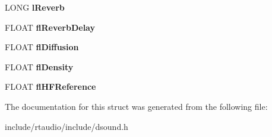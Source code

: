 \begin{DoxyCompactItemize}
\item 
L\+O\+NG {\bfseries l\+Reverb}\hypertarget{struct___d_s_f_x_i3_d_l2_reverb_abd4a04f678bc94a61feb77587de3b6cd}{}\label{struct___d_s_f_x_i3_d_l2_reverb_abd4a04f678bc94a61feb77587de3b6cd}

\item 
F\+L\+O\+AT {\bfseries fl\+Reverb\+Delay}\hypertarget{struct___d_s_f_x_i3_d_l2_reverb_ac42bdcb85a3f4519857687b96a066bd7}{}\label{struct___d_s_f_x_i3_d_l2_reverb_ac42bdcb85a3f4519857687b96a066bd7}

\item 
F\+L\+O\+AT {\bfseries fl\+Diffusion}\hypertarget{struct___d_s_f_x_i3_d_l2_reverb_a947858e3e8e859fa23a9184fc8597e8a}{}\label{struct___d_s_f_x_i3_d_l2_reverb_a947858e3e8e859fa23a9184fc8597e8a}

\item 
F\+L\+O\+AT {\bfseries fl\+Density}\hypertarget{struct___d_s_f_x_i3_d_l2_reverb_a66ccde21800aa250e6f9eb749164d43a}{}\label{struct___d_s_f_x_i3_d_l2_reverb_a66ccde21800aa250e6f9eb749164d43a}

\item 
F\+L\+O\+AT {\bfseries fl\+H\+F\+Reference}\hypertarget{struct___d_s_f_x_i3_d_l2_reverb_ae3eaa2deaabcbc84943a8b0782e58eb3}{}\label{struct___d_s_f_x_i3_d_l2_reverb_ae3eaa2deaabcbc84943a8b0782e58eb3}

\end{DoxyCompactItemize}


The documentation for this struct was generated from the following file\+:\begin{DoxyCompactItemize}
\item 
include/rtaudio/include/dsound.\+h\end{DoxyCompactItemize}
